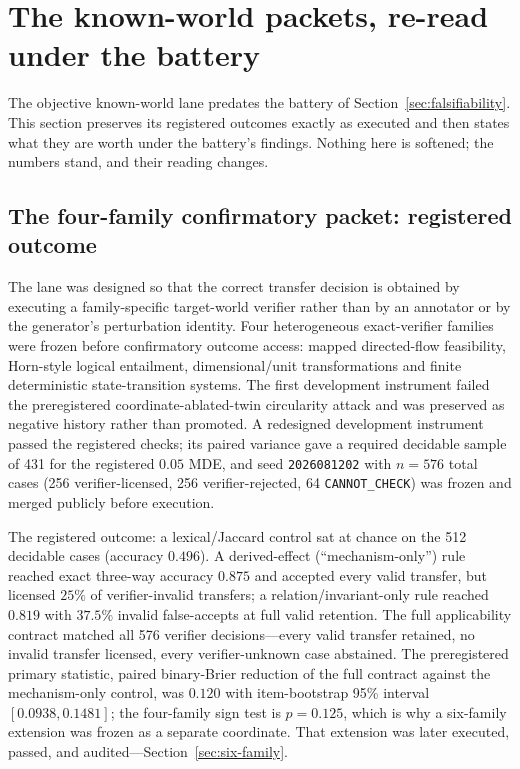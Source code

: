 \section{The known-world packets, re-read under the battery}
\label{sec:known-world}

The objective known-world lane predates the battery of Section~\ref{sec:falsifiability}. This section preserves its registered outcomes exactly as executed and then states what they are worth under the battery's findings. Nothing here is softened; the numbers stand, and their reading changes.

\subsection{The four-family confirmatory packet: registered outcome}

The lane was designed so that the correct transfer decision is obtained by executing a family-specific target-world verifier rather than by an annotator or by the generator's perturbation identity. Four heterogeneous exact-verifier families were frozen before confirmatory outcome access: mapped directed-flow feasibility, Horn-style logical entailment, dimensional/unit transformations and finite deterministic state-transition systems. The first development instrument failed the preregistered coordinate-ablated-twin circularity attack and was preserved as negative history rather than promoted. A redesigned development instrument passed the registered checks; its paired variance gave a required decidable sample of 431 for the registered $0.05$ MDE, and seed \texttt{2026081202} with $n=576$ total cases (256 verifier-licensed, 256 verifier-rejected, 64 \texttt{CANNOT\_CHECK}) was frozen and merged publicly before execution.

The registered outcome: a lexical/Jaccard control sat at chance on the 512 decidable cases (accuracy $0.496$). A derived-effect (``mechanism-only'') rule reached exact three-way accuracy $0.875$ and accepted every valid transfer, but licensed $25\%$ of verifier-invalid transfers; a relation/invariant-only rule reached $0.819$ with $37.5\%$ invalid false-accepts at full valid retention. The full applicability contract matched all 576 verifier decisions---every valid transfer retained, no invalid transfer licensed, every verifier-unknown case abstained. The preregistered primary statistic, paired binary-Brier reduction of the full contract against the mechanism-only control, was $0.120$ with item-bootstrap 95\% interval $[0.0938,0.1481]$; the four-family sign test is $p=0.125$, which is why a six-family extension was frozen as a separate coordinate. That extension was later executed, passed, and audited---Section~\ref{sec:six-family}.

